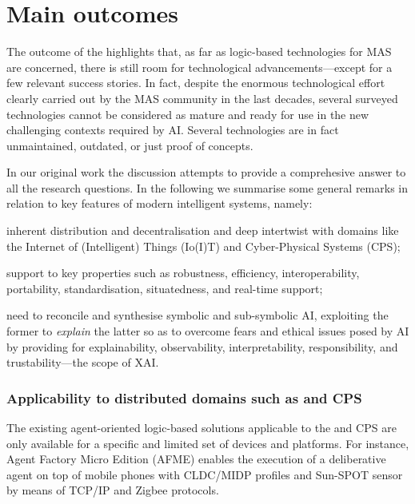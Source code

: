 \documentclass[12pt,a4paper,openright,twoside]{book}
\begin{document}
\section{Main outcomes}\label{sec:outcomes}

The outcome of the \slr{} highlights that, as far as logic-based technologies for MAS are concerned, there is still room for technological advancements---except for a few relevant success stories.
%
In fact, despite the enormous technological effort clearly carried out by the MAS community in the last decades, several surveyed technologies cannot be considered as mature and ready for use in the new challenging contexts required by AI.
%
Several technologies are in fact unmaintained, outdated, or just proof of concepts.

In our original work the discussion attempts to provide a comprehesive answer to all the \slr{} research questions.
%
In the following we summarise some general remarks in relation to key features of modern intelligent systems, namely:
%
\begin{inlinelist}
    \item inherent distribution and decentralisation and deep intertwist with domains like the Internet of (Intelligent) Things (Io(I)T) and Cyber-Physical Systems (CPS);
    \item support to key properties such as robustness, efficiency, interoperability, portability, standardisation, situatedness, and real-time support;
    \item need to reconcile and synthesise symbolic and sub-symbolic AI, exploiting the former to \emph{explain} the latter so as to overcome fears and ethical issues posed by AI by providing for explainability, observability, interpretability, responsibility, and trustability---the scope of XAI.
\end{inlinelist}

\subsubsection{Applicability to distributed domains such as \iot{} and CPS}

The existing agent-oriented logic-based solutions applicable to the \iot{} and CPS are only available for a specific and limited set of devices and platforms.
%
For instance, Agent Factory Micro Edition (AFME) \cite{afme-iccs2006} enables the execution of a deliberative agent on top of mobile phones with CLDC/MIDP profiles and Sun-SPOT sensor by means of TCP/IP and Zigbee protocols.
\end{document}
